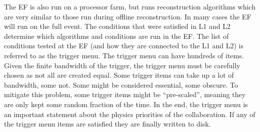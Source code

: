 The EF is also run on a processor farm, but runs reconstruction algorithms
which are very similar to those run during offline reconstruction.
In many cases the EF will run on the full event. The conditions
that were satisfied in L1 and L2 determine which algorithms and conditions
are run in the EF.  The list of conditions tested at the EF (and 
how they are connected to the L1 and L2) is referred to as the trigger menu.
The trigger menu can have hundreds of items.
Given the finite bandwidth of the trigger, the trigger menu
must be carefully chosen as not all are created equal. Some 
trigger items can take up a lot of bandwidth, some not.
Some might be considered essential, some obscure.
To mitigate this problem, some trigger items might be ``pre-scaled'',
meaning they are only kept some random fraction of the time.
In the end, the trigger menu is an important statement about the physics
priorities of the collaboration.
If any of the trigger menu items are satisfied they are finally written to disk.













